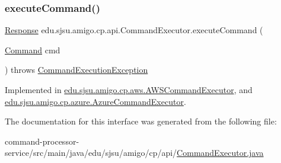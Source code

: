 \subsubsection{\texorpdfstring{execute\+Command()}{executeCommand()}}
{\footnotesize\ttfamily \hyperlink{classedu_1_1sjsu_1_1amigo_1_1cp_1_1api_1_1_response}{Response} edu.\+sjsu.\+amigo.\+cp.\+api.\+Command\+Executor.\+execute\+Command (\begin{DoxyParamCaption}\item[{\hyperlink{classedu_1_1sjsu_1_1amigo_1_1cp_1_1api_1_1_command}{Command}}]{cmd }\end{DoxyParamCaption}) throws \hyperlink{classedu_1_1sjsu_1_1amigo_1_1cp_1_1api_1_1_command_execution_exception}{Command\+Execution\+Exception}}



Implemented in \hyperlink{classedu_1_1sjsu_1_1amigo_1_1cp_1_1aws_1_1_a_w_s_command_executor_adea0b25883968832b0a44d9a368c3875}{edu.\+sjsu.\+amigo.\+cp.\+aws.\+A\+W\+S\+Command\+Executor}, and \hyperlink{classedu_1_1sjsu_1_1amigo_1_1cp_1_1azure_1_1_azure_command_executor_abc6031fa5814897ec7fbacd40ac93866}{edu.\+sjsu.\+amigo.\+cp.\+azure.\+Azure\+Command\+Executor}.



The documentation for this interface was generated from the following file\+:\begin{DoxyCompactItemize}
\item 
command-\/processor-\/service/src/main/java/edu/sjsu/amigo/cp/api/\hyperlink{_command_executor_8java}{Command\+Executor.\+java}\end{DoxyCompactItemize}
